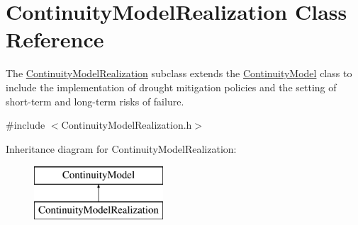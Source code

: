 \hypertarget{classContinuityModelRealization}{}\section{Continuity\+Model\+Realization Class Reference}
\label{classContinuityModelRealization}


The {\ttfamily \mbox{\hyperlink{classContinuityModelRealization}{Continuity\+Model\+Realization}}} subclass extends the {\ttfamily \mbox{\hyperlink{classContinuityModel}{Continuity\+Model}}} class to include the implementation of drought mitigation policies and the setting of short-\/term and long-\/term risks of failure.  




{\ttfamily \#include $<$Continuity\+Model\+Realization.\+h$>$}

Inheritance diagram for Continuity\+Model\+Realization\+:\begin{figure}[H]
\begin{center}
\leavevmode
\includegraphics[height=2.000000cm]{classContinuityModelRealization}
\end{center}
\end{figure}
